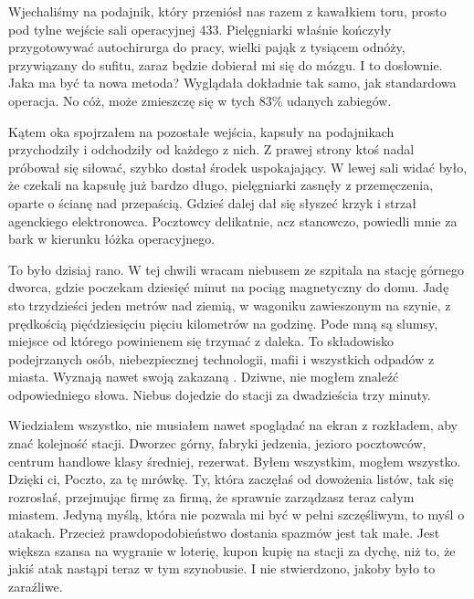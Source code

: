 Wjechaliśmy na podajnik, który przeniósł nas razem z kawałkiem toru, prosto pod tylne wejście sali operacyjnej 433.
Pielęgniarki właśnie kończyły przygotowywać autochirurga do pracy, wielki pająk z tysiącem odnóży, przywiązany do sufitu, zaraz będzie dobierał mi się do mózgu. I to dosłownie.
Jaka ma być ta nowa metoda? Wyglądała dokładnie tak samo, jak standardowa operacja. No cóż, może zmieszczę się w tych 83\% udanych zabiegów.

Kątem oka spojrzałem na pozostałe wejścia, kapsuły na podajnikach przychodziły i odchodziły od każdego z nich.
Z prawej strony ktoś nadal próbował się siłować, szybko dostał środek uspokajający.
W lewej sali widać było, że czekali na kapsułę już bardzo długo, pielęgniarki zasnęły z przemęczenia, oparte o ścianę nad przepaścią.
Gdzieś dalej dał się słyszeć krzyk i strzał agenckiego elektronowca.
Pocztowcy delikatnie, acz stanowczo, powiedli mnie za bark w kierunku łóżka operacyjnego.

\divider{}

To było dzisiaj rano. W tej chwili wracam niebusem ze szpitala na stację górnego dworca, gdzie poczekam dziesięć minut na pociąg magnetyczny do domu.
Jadę sto trzydzieści jeden metrów nad ziemią, w wagoniku zawieszonym na szynie, z prędkością pięćdziesięciu pięciu kilometrów na godzinę. 
Pode mną są slumsy, miejsce od którego powinienem się trzymać z daleka. 
To składowisko podejrzanych osób, niebezpiecznej technologii, mafii i wszystkich odpadów z miasta.
Wyznają nawet swoją zakazaną \censor{}.
Dziwne, nie mogłem znaleźć odpowiedniego słowa.
Niebus dojedzie do stacji za dwadzieścia trzy minuty.

Wiedziałem wszystko, nie musiałem nawet spoglądać na ekran z rozkładem, aby znać kolejność stacji.
Dworzec górny, fabryki jedzenia, jezioro pocztowców, centrum handlowe klasy średniej, rezerwat.
Byłem wszystkim, mogłem wszystko. 
Dzięki ci, Poczto, za tę mrówkę. Ty, która zaczęłaś od dowożenia listów, tak się rozrosłaś, przejmując firmę za firmą, że sprawnie zarządzasz teraz całym miastem.
Jedyną myślą, która nie pozwala mi być w pełni szczęśliwym, to myśl o atakach. Przecież prawdopodobieństwo dostania spazmów jest tak małe.
Jest większa szansa na wygranie w loterię, kupon kupię na stacji za dychę, niż to, że jakiś atak nastąpi teraz w tym szynobusie.
I nie stwierdzono, jakoby było to zaraźliwe.

